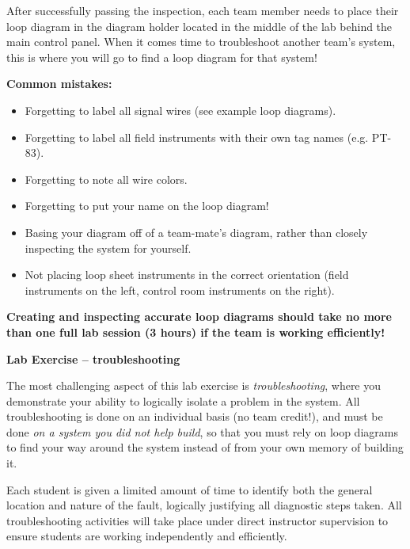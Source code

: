 \begin{itemize}
After successfully passing the inspection, each team member needs to place their loop diagram in the diagram holder located in the middle of the lab behind the main control panel.  When it comes time to troubleshoot another team's system, this is where you will go to find a loop diagram for that system!

\vskip 10pt

{\bf Common mistakes:}

\begin{itemize}
\item{} Forgetting to label all signal wires (see example loop diagrams).
\item{} Forgetting to label all field instruments with their own tag names (e.g. PT-83).
\item{} Forgetting to note all wire colors.
\item{} Forgetting to put your name on the loop diagram!
\item{} Basing your diagram off of a team-mate's diagram, rather than closely inspecting the system for yourself.
\item{} Not placing loop sheet instruments in the correct orientation (field instruments on the left, control room instruments on the right).
\end{itemize}

\vskip 10pt

{\bf Creating and inspecting accurate loop diagrams should take no more than one full lab session (3 hours) if the team is working efficiently!}







\vfil \eject

\noindent
{\bf Lab Exercise -- troubleshooting}

\vskip 5pt

The most challenging aspect of this lab exercise is {\it troubleshooting}, where you demonstrate your ability to logically isolate a problem in the system.  All troubleshooting is done on an individual basis (no team credit!), and must be done {\it on a system you did not help build}, so that you must rely on loop diagrams to find your way around the system instead of from your own memory of building it.

Each student is given a limited amount of time to identify both the general location and nature of the fault, logically justifying all diagnostic steps taken.  All troubleshooting activities will take place under direct instructor supervision to ensure students are working independently and efficiently. 


\end{itemize}
